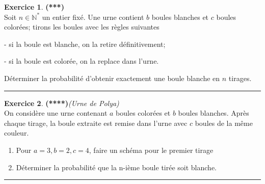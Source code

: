 \documentclass[a4paper,11pt]{article}
\theoremstyle{definition}
\newtheorem{exo}{Exercice} %
\begin{document}
\begin{minipage}{1\linewidth}
\begin{minipage}[c]{0.48\linewidth}
\begin{exo}\textbf{(***)}\quad\\[0.2cm]
	Soit $n \in \mathbb{N}^{*}$ un entier fixé. Une urne contient $b$ boules blanches et $c$ boules colorées; tirons les boules avec les règles suivantes
	
	- si la boule est blanche, on la retire définitivement;
	
	- si la boule est colorée, on la replace dans l'urne.
	
	Déterminer la probabilité d'obtenir exactement une boule blanche en $n$ tirages.
	
	\centering\rule{1\linewidth}{0.6pt}\end{exo}


\begin{exo}\textbf{(****)}\quad\textit{(Urne de \sc Polya)}\\[0.2cm]
	
	On considère une urne contenant $a$ boules colorées et $b$ boules blanches. Après chaque tirage, la boule extraite est remise dans l'urne avec $c$ boules de la même couleur.
	\begin{enumerate}
		\item Pour $a=3, b=2, c=4$, faire un schéma pour le premier tirage
		\item Déterminer la probabilité que la n-ième boule tirée soit blanche.
	\end{enumerate}
	
	
	
	\centering\rule{1\linewidth}{0.6pt}\end{exo}


\end{minipage}\end{minipage} \newpage
\end{document}
